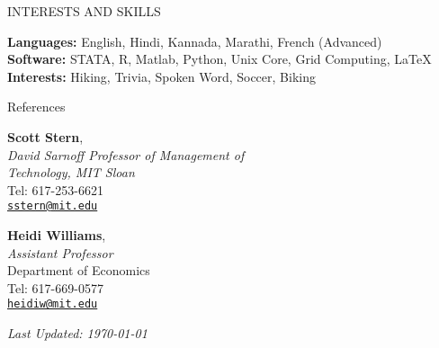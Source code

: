 \documentclass{resume} %
\begin{document}
\newpage
\begin{rSection}{INTERESTS AND SKILLS}

{\bf Languages:} English, Hindi, Kannada, Marathi, French (Advanced) \\
{\bf Software:} STATA, R, Matlab, Python, Unix Core, Grid Computing, \LaTeX
{\bf Interests:} Hiking, Trivia, Spoken Word, Soccer, Biking

\end{rSection}


\begin{rSection}{References}
\begin{multicols}{2}

{\bf Scott Stern}, \\
\emph{David Sarnoff Professor of Management of \\ Technology, MIT Sloan} \\
Tel: 617-253-6621 \\ 
\texttt{\href{mailto:sstern@mit.edu}{sstern@mit.edu}} 

\columnbreak

{\bf Heidi Williams}, \\
\emph{Assistant Professor} \\
Department of Economics \\
Tel: 617-669-0577 \\
\texttt{\href{mailto:heidiw@mit.edu}{heidiw@mit.edu}}




\end{multicols}

\end{rSection}

%
\vspace{0.3cm}
\begin{center}
\emph{Last Updated: \today} 
\end{center}
\end{document}
